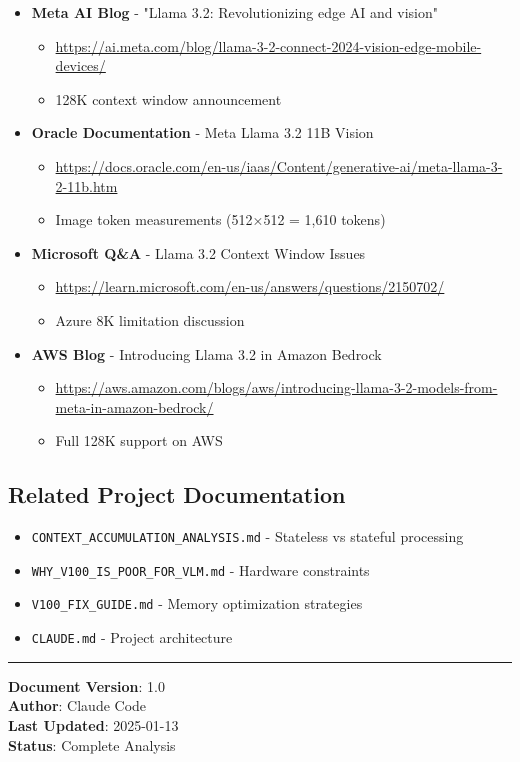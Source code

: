 \documentclass[11pt,a4paper]{article}
\begin{document}
\begin{itemize}[leftmargin=*]
    \item \textbf{Meta AI Blog} - "Llama 3.2: Revolutionizing edge AI and vision"
    \begin{itemize}
        \item \url{https://ai.meta.com/blog/llama-3-2-connect-2024-vision-edge-mobile-devices/}
        \item 128K context window announcement
    \end{itemize}

    \item \textbf{Oracle Documentation} - Meta Llama 3.2 11B Vision
    \begin{itemize}
        \item \url{https://docs.oracle.com/en-us/iaas/Content/generative-ai/meta-llama-3-2-11b.htm}
        \item Image token measurements (512×512 = 1,610 tokens)
    \end{itemize}

    \item \textbf{Microsoft Q\&A} - Llama 3.2 Context Window Issues
    \begin{itemize}
        \item \url{https://learn.microsoft.com/en-us/answers/questions/2150702/}
        \item Azure 8K limitation discussion
    \end{itemize}

    \item \textbf{AWS Blog} - Introducing Llama 3.2 in Amazon Bedrock
    \begin{itemize}
        \item \url{https://aws.amazon.com/blogs/aws/introducing-llama-3-2-models-from-meta-in-amazon-bedrock/}
        \item Full 128K support on AWS
    \end{itemize}
\end{itemize}

\subsection{Related Project Documentation}

\begin{itemize}[leftmargin=*]
    \item \texttt{CONTEXT\_ACCUMULATION\_ANALYSIS.md} - Stateless vs stateful processing
    \item \texttt{WHY\_V100\_IS\_POOR\_FOR\_VLM.md} - Hardware constraints
    \item \texttt{V100\_FIX\_GUIDE.md} - Memory optimization strategies
    \item \texttt{CLAUDE.md} - Project architecture
\end{itemize}

\vspace{0.5cm}
\hrule
\vspace{0.3cm}

\noindent\textbf{Document Version}: 1.0\\
\textbf{Author}: Claude Code\\
\textbf{Last Updated}: 2025-01-13\\
\textbf{Status}: Complete Analysis
\end{document}
